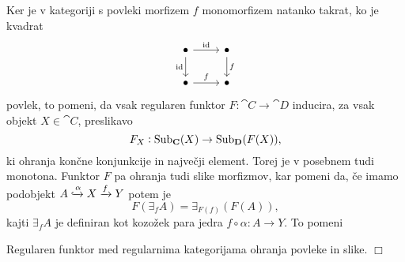 \documentclass[../kategoricna_logika.tex]{subfiles}
\begin{document}
Ker je v kategoriji s povleki morfizem $f$ monomorfizem natanko takrat, ko je kvadrat
\begin{equation*}
  \begin{tikzcd}
    \bullet \ar[d, "\mathrm{id}"'] \ar[r, "\mathrm{id}"] & \bullet \ar[d, "f"] \\
    \bullet \ar[r, "f"] & \bullet
  \end{tikzcd}
\end{equation*}
povlek, to pomeni, da vsak regularen funktor $F : \cat{C} \to \cat{D}$ inducira, za vsak objekt $X \in \cat{C}$, preslikavo
$$F_X : \operatorname{Sub}_{\operatorname{\mathbf{C}}}(X) \to \operatorname{Sub}_{\operatorname{\mathbf{D}}}(F(X)),$$
ki ohranja končne konjunkcije in največji element. Torej je v posebnem tudi monotona.
Funktor $F$ pa ohranja tudi slike morfizmov, kar pomeni da, če imamo podobjekt 
$A \xhookrightarrow{\alpha} X \xrightarrow{f} Y$ potem je 
$$F(\exists_f A) = \exists_{F(f)}(F(A)),$$
kajti $\exists_f A$ je definiran kot kozožek para jedra $f \circ \alpha : A \to Y$.
To pomeni
\begin{lema}
  Regularen funktor med regularnima kategorijama ohranja povleke in slike.
  \hfill$\Box$
\end{lema}
%
\end{document}
